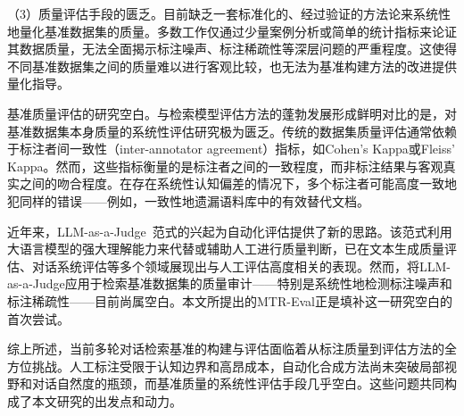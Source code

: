 （3）质量评估手段的匮乏。目前缺乏一套标准化的、经过验证的方法论来系统性地量化基准数据集的质量。多数工作仅通过少量案例分析或简单的统计指标来论证其数据质量，无法全面揭示标注噪声、标注稀疏性等深层问题的严重程度。这使得不同基准数据集之间的质量难以进行客观比较，也无法为基准构建方法的改进提供量化指导。


基准质量评估的研究空白。与检索模型评估方法的蓬勃发展形成鲜明对比的是，对基准数据集本身质量的系统性评估研究极为匮乏。传统的数据集质量评估通常依赖于标注者间一致性（inter-annotator agreement）指标，如Cohen's Kappa或Fleiss' Kappa。然而，这些指标衡量的是标注者之间的一致程度，而非标注结果与客观真实之间的吻合程度。在存在系统性认知偏差的情况下，多个标注者可能高度一致地犯同样的错误——例如，一致性地遗漏语料库中的有效替代文档。

近年来，LLM-as-a-Judge~\citep{zheng2023judging}范式的兴起为自动化评估提供了新的思路。该范式利用大语言模型的强大理解能力来代替或辅助人工进行质量判断，已在文本生成质量评估、对话系统评估等多个领域展现出与人工评估高度相关的表现。然而，将LLM-as-a-Judge应用于检索基准数据集的质量审计——特别是系统性地检测标注噪声和标注稀疏性——目前尚属空白。本文所提出的MTR-Eval正是填补这一研究空白的首次尝试。

综上所述，当前多轮对话检索基准的构建与评估面临着从标注质量到评估方法的全方位挑战。人工标注受限于认知边界和高昂成本，自动化合成方法尚未突破局部视野和对话自然度的瓶颈，而基准质量的系统性评估手段几乎空白。这些问题共同构成了本文研究的出发点和动力。










